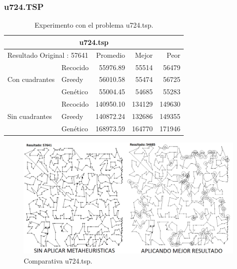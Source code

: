 \subsubsection{u724.TSP}
\begin{table}[hbtp]
 \centering 
    \caption{Experimento con el problema u724.tsp.}
	\begin{tabular}{ | l   l | r | r | r |   }
         \hline \multicolumn{5}{|c|}{ \rowcolor[gray]{0.8}u724.tsp } \\\hline
         \multicolumn{2}{|l|}{Resultado Original : 57641} & Promedio & Mejor & Peor \\ \hline
                & Recocido  & 55976.89 & 55514 & 56479  \\ 
 Con cuadrantes & Greedy    & 56010.58 & 55474 & 56725  \\ 
                & Genético  & \cellcolor[gray]{0.9} 55004.45 & \cellcolor[gray]{0.9} 54685 & \cellcolor[gray]{0.9} 55283 \\ \hline
                & Recocido  & 140950.10 & 134129 & 149630   \\ 
 Sin cuadrantes & Greedy    & \cellcolor[gray]{0.9} 140872.24 & \cellcolor[gray]{0.9} 132686 & \cellcolor[gray]{0.9} 149355 \\ 
                & Genético  & 168973.59 & 164770 & 171946   \\ 
                \hline
    \end{tabular}
    \label{table:EXP_u724.tsp}
\end{table}	
\begin{figure}[hbtp]
    \centering
        \includegraphics[width=1\textwidth]{PruebasResultados/Experimentos_Comparativas/u724.png}
        \caption{Comparativa u724.tsp.}
        \label{fig:u724_comparativa.png}
\end{figure}
